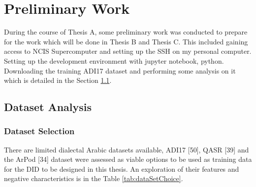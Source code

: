 \chapter{Preliminary Work}\label{ch:prelim}
During the course of Thesis A, some preliminary work was conducted to prepare for the work which will be done in 
Thesis B and Thesis C. This included gaining access to NCIS Supercomputer and setting up the SSH on my personal computer. 
Setting up the development environment with jupyter notebook, python. Downloading the training ADI17 dataset and performing 
some analysis on it which is detailed in the Section \ref{sec:dataset}. 

\section{Dataset Analysis}\label{sec:dataset}
\subsection{Dataset Selection}
There are limited dialectal Arabic datasets available, ADI17 [50], QASR [39] and the ArPod [34]
dataset were assessed as viable options to be used as training data for the DID to be designed in this 
thesis. An exploration of their features and negative characteristics is in the Table \ref{tab:dataSetChoice}.\\

